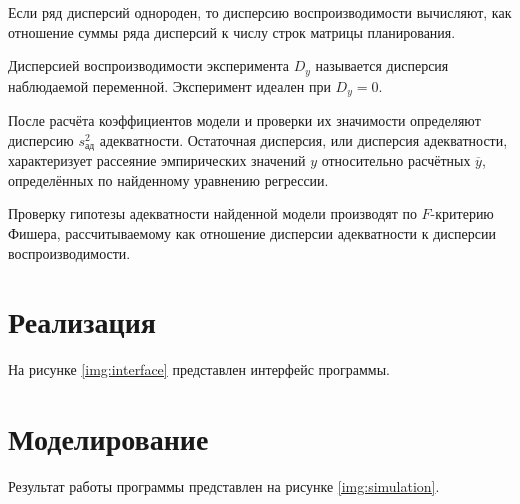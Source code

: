 \documentclass[a4paper, 14pt]{extreport}
\begin{document}
\begin{MainPart}
Если ряд дисперсий однороден, то дисперсию воспроизводимости вычисляют, как отношение суммы ряда дисперсий к числу строк матрицы планирования.

Дисперсией воспроизводимости эксперимента $D_y$ называется дисперсия наблюдаемой переменной.
Эксперимент идеален при $D_y = 0$.

После расчёта коэффициентов модели и проверки их значимости определяют дисперсию $s^2_{\text{ад}}$ адекватности.
Остаточная дисперсия, или дисперсия адекватности, характеризует рассеяние эмпирических значений $y$ относительно расчётных $\overline y$, определённых по найденному уравнению регрессии.

Проверку гипотезы адекватности найденной модели производят по $F$-критерию Фишера, рассчитываемому как отношение дисперсии адекватности к дисперсии воспроизводимости.

\section{Реализация}

На рисунке \ref{img:interface} представлен интерфейс программы.


\section{Моделирование}

Результат работы программы представлен на рисунке \ref{img:simulation}.



\end{MainPart}
\end{document}
